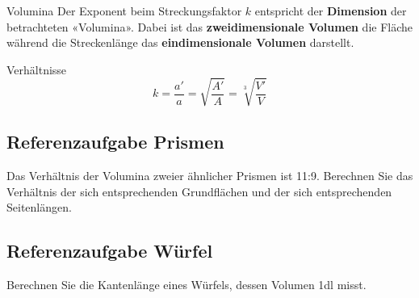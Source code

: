 \begin{bemerkung}{Volumina}{}
Der Exponent beim Streckungsfaktor $k$ entspricht der \textbf{Dimension} der
betrachteten «Volumina». Dabei ist das \textbf{zweidimensionale Volumen} die
Fläche während die Streckenlänge das \textbf{eindimensionale Volumen} darstellt.
\end{bemerkung}

\begin{bemerkung}{Verhältnisse}{}
  $$k = \frac{a'}{a} = \sqrt{\frac{A'}{A}} = \sqrt[3\,\,\,]{\frac{V'}{V}}$$
\end{bemerkung}
\newpage


\subsection{Referenzaufgabe Prismen}
Das Verhältnis der Volumina zweier ähnlicher Prismen ist
11:9. Berechnen Sie das Verhältnis der sich entsprechenden Grundflächen und
der sich entsprechenden Seitenlängen.


\subsection{Referenzaufgabe Würfel}
Berechnen Sie die Kantenlänge eines Würfels, dessen Volumen 1dl misst.


\newpage
